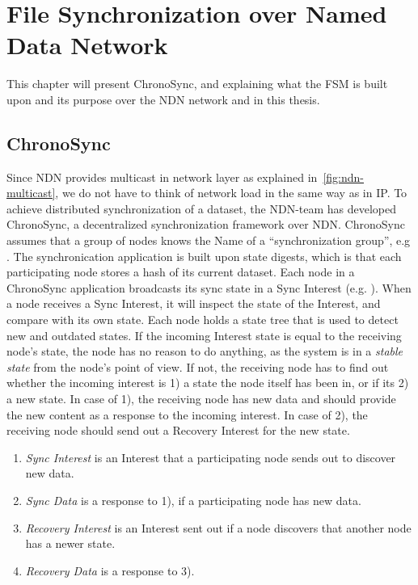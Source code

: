 \chapter{File Synchronization over Named Data Network}\label{chp3:application}
This chapter will present ChronoSync, and explaining what the \gls{FSM} is built upon and its purpose over the \gls{NDN} network and in this thesis. 

\section{ChronoSync}\label{chronosync}
Since \gls{NDN} provides multicast in network layer as explained in~\autoref{fig:ndn-multicast}, we do not have to think of network load in the same way as in \gls{IP}.  
To achieve distributed synchronization of a dataset, the \gls{NDN}-team has developed ChronoSync, a decentralized synchronization framework over \gls{NDN}. 
ChronoSync assumes that a group of nodes knows the Name of a ``synchronization group'', e.g .
The synchronication application is built upon state digests, which is that each participating node stores a hash of its current dataset. 
Each node in a ChronoSync application broadcasts its sync state in a Sync Interest (e.g. ).
When a node receives a Sync Interest, it will inspect the state of the Interest, and compare with its own state.
Each node holds a state tree that is used to detect new and outdated states.
If the incoming Interest state is equal to the receiving node's state, the node has no reason to do anything, as the system is in a \textit{stable state} from the node's point of view.
If not, the receiving node has to find out whether the incoming interest is 1) a state the node itself has been in, or if its 2) a new state.
In case of 1), the receiving node has new data and should provide the new content as a response to the incoming interest. In case of 2), the receiving node should send out a Recovery Interest for the new state.

\begin{enumerate}
  \item \textit{Sync Interest} is an Interest that a participating node sends out to discover new data.
  \item \textit{Sync Data} is a response to 1), if a participating node has new data.
  \item \textit{Recovery Interest} is an Interest sent out if a node discovers that another node has a newer state.
  \item \textit{Recovery Data} is a response to 3).
\end{enumerate}

